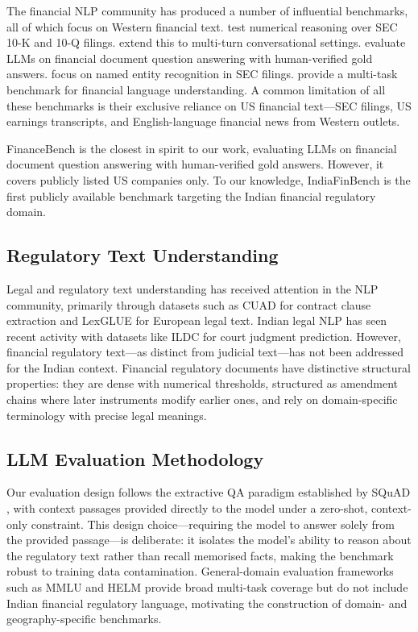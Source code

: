 \documentclass[11pt]{article}
\begin{document}
The financial NLP community has produced a number of influential benchmarks,
all of which focus on Western financial text. \citet{chen2021finqa} test
numerical reasoning over SEC 10-K and 10-Q filings. \citet{zheng2022convfinqa}
extend this to multi-turn conversational settings. \citet{islam2023financebench}
evaluate LLMs on financial document question answering with human-verified gold
answers. \citet{loukas2022finer} focus on named entity recognition in SEC
filings. \citet{shah2022flue} provide a multi-task benchmark for financial
language understanding. A common limitation of all these benchmarks is their
exclusive reliance on US financial text---SEC filings, US earnings transcripts,
and English-language financial news from Western outlets.

FinanceBench \citep{islam2023financebench} is the closest in spirit to our
work, evaluating LLMs on financial document question answering with
human-verified gold answers. However, it covers publicly listed US companies
only. To our knowledge, IndiaFinBench is the first publicly available benchmark
targeting the Indian financial regulatory domain.

\subsection{Regulatory Text Understanding}

Legal and regulatory text understanding has received attention in the NLP
community, primarily through datasets such as CUAD \citep{hendrycks2021cuad}
for contract clause extraction and LexGLUE \citep{chalkidis2022lexglue} for
European legal text. Indian legal NLP has seen recent activity with datasets
like ILDC \citep{malik2021ildc} for court judgment prediction. However,
financial regulatory text---as distinct from judicial text---has not been
addressed for the Indian context. Financial regulatory documents have
distinctive structural properties: they are dense with numerical thresholds,
structured as amendment chains where later instruments modify earlier ones, and
rely on domain-specific terminology with precise legal meanings.

\subsection{LLM Evaluation Methodology}

Our evaluation design follows the extractive QA paradigm established by
SQuAD \citep{rajpurkar2016squad}, with context passages provided directly to
the model under a zero-shot, context-only constraint. This design
choice---requiring the model to answer solely from the provided
passage---is deliberate: it isolates the model's ability to reason about the
regulatory text rather than recall memorised facts, making the benchmark robust
to training data contamination. General-domain evaluation frameworks such as
MMLU \citep{hendrycks2021mmlu} and HELM \citep{liang2022helm} provide broad
multi-task coverage but do not include Indian financial regulatory language,
motivating the construction of domain- and geography-specific benchmarks.
\end{document}
